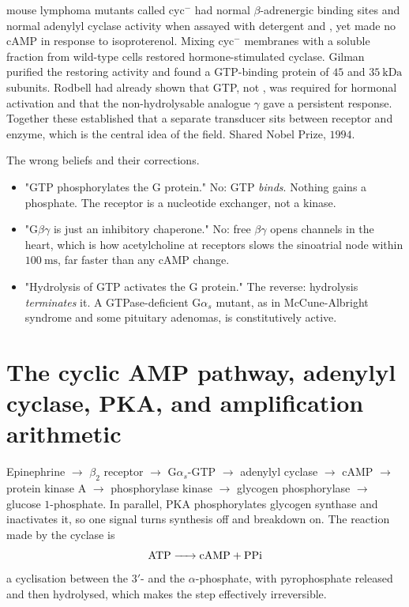 \begin{expbox}[title={EXPERIMENT: Gilman's cyc$^-$ complementation, 1977--1980}]
 mouse lymphoma mutants called cyc$^-$ had normal $\beta$-adrenergic binding
sites and normal adenylyl cyclase activity when assayed with detergent and
, yet made no cAMP in response to isoproterenol. Mixing cyc$^-$ membranes
with a soluble fraction from wild-type cells restored hormone-stimulated cyclase.
Gilman purified the restoring activity and found a GTP-binding protein of $45$ and
$35\ \mathrm{kDa}$ subunits. Rodbell had already shown that GTP, not , was
required for hormonal activation and that the non-hydrolysable analogue
$\gamma$ gave a persistent response. Together these established that a
separate transducer sits between receptor and enzyme, which is the central idea of
the field. Shared Nobel Prize, $1994$.
\end{expbox}

\begin{warnbox}[title={TRAP: three errors about G proteins}]
The wrong beliefs and their corrections.
\begin{itemize}
\item "GTP phosphorylates the G protein." No: GTP \emph{binds}. Nothing gains a
phosphate. The receptor is a nucleotide exchanger, not a kinase.
\item "$\mathrm{G}\beta\gamma$ is just an inhibitory chaperone." No: free
$\beta\gamma$ opens  channels in the heart, which is how acetylcholine at
 receptors slows the sinoatrial node within $100\ \mathrm{ms}$, far faster than
any cAMP change.
\item "Hydrolysis of GTP activates the G protein." The reverse: hydrolysis
\emph{terminates} it. A GTPase-deficient $\mathrm{G}\alpha_s$ mutant, as in
McCune-Albright syndrome and some pituitary adenomas, is constitutively active.
\end{itemize}
\end{warnbox}

\section{The cyclic AMP pathway, adenylyl cyclase, PKA, and amplification arithmetic}

\begin{keybox}[title={MEMORIZE: the canonical cAMP cascade}]
Epinephrine $\rightarrow$ $\beta_2$ receptor $\rightarrow$ $\mathrm{G}\alpha_s$-GTP
$\rightarrow$ adenylyl cyclase $\rightarrow$ cAMP $\rightarrow$ protein kinase A
$\rightarrow$ phosphorylase kinase $\rightarrow$ glycogen phosphorylase
$\rightarrow$ glucose $1$-phosphate. In parallel, PKA phosphorylates glycogen
synthase and inactivates it, so one signal turns synthesis off and breakdown on.
The reaction made by the cyclase is
\[
\ce{ATP -> cAMP + PPi}
\]
a cyclisation between the $3'$- and the $\alpha$-phosphate, with
pyrophosphate released and then hydrolysed, which makes the step effectively
irreversible.
\end{keybox}

